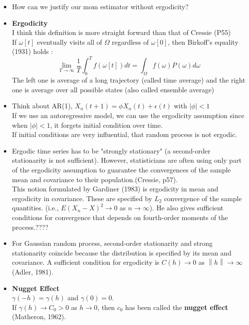 \documentclass[11pt]{article}
\begin{document}
\begin{itemize}
\item How can we justify our mom estimator without ergodicity?\\

\item 
\textbf{Ergodicity}\\
I think this definition is more straight forward than that of Cressie (P55)\\
If $\omega[t]$ eventually visits all of $\Omega$ regardless of $\omega[0]$, then Birkoff's equality (1931) holds :\\
$$\lim_{T \rightarrow \infty} \frac{1}{T} \int_{0}^{T}f(\omega [t])dt = \int_{\Omega}f(\omega)P(\omega)d\omega$$  
The left one is average of a long trajectory (called time average) and the right one is average over all possible states (also called ensemble average)\\


\item 
Think about AR(1), $X_n(t+1) = \phi X_n(t) + \epsilon(t)$ with $|\phi| <1$\\
If we use an autoregressive model, we can use the ergodicity assumption since when $|\phi| <1$, it forgets initial condition over time.\\
If initial conditions are very influential, that random process is not ergodic.\\

\item 
Ergodic time series has to be "strongly stationary" (a second-order stationarity is not sufficient). However, statisticians are often using only part of the ergodicity assumption to guarantee the convergences of the sample mean and covariance to their population.(Cressie, p57).\\
This notion formulated by Gardiner (1983) is ergodicity in mean and ergodicity in covariance. These are specified by $L_2$ convergence of the sample quantities. (i.e., $E(X_n - X)^2 \rightarrow 0$ as $n \rightarrow \infty$). {\color{red} He also gives sufficient conditions for convergence that depends on fourth-order moments of the process.????}\\

\item
For Gaussian random process, second-order stationarity and strong stationarity coincide because the distribution is specified by its mean and covariance. A sufficient condition for ergodicity is $C(h) \rightarrow 0$ as $\left \| h \right \| \rightarrow \infty$ (Adler, 1981).

\item
\textbf{Nugget Effect}\\
$\gamma(-h) = \gamma(h)$ and $\gamma(0)=0$.\\
If $\gamma(h) \rightarrow C_0 > 0$ as $h \rightarrow 0$, then $c_0$ has been called the \textbf{nugget effect} (Matheron, 1962).\\


\end{itemize}
\end{document}
